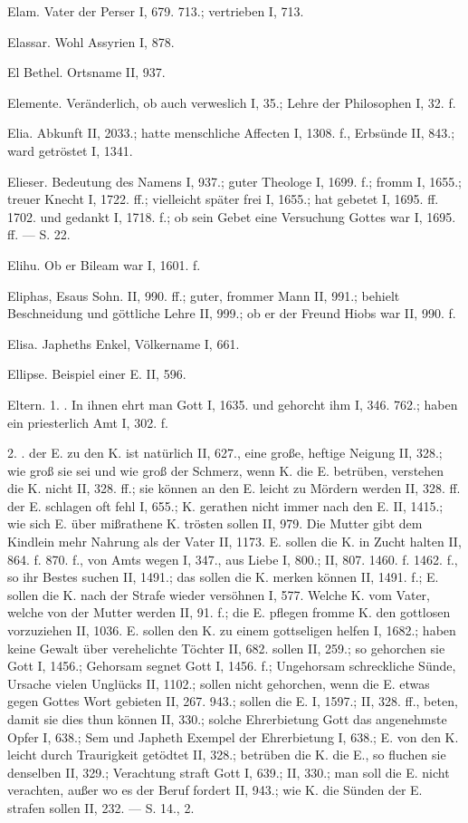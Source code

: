 Elam. Vater der Perser I, 679. 713.; vertrieben I, 713.

Elassar. Wohl Assyrien I, 878.

El Bethel. Ortsname II, 937.

Elemente. Veränderlich, ob auch verweslich I, 35.; Lehre der Philosophen I, 32. f.

Elia. Abkunft II, 2033.; hatte menschliche Affecten I, 1308. f., Erbsünde II, 843.; ward getröstet I, 1341.

Elieser. Bedeutung des Namens I, 937.; guter Theologe I, 1699. f.; fromm I, 1655.; treuer Knecht I, 1722. ff.; vielleicht später frei I, 1655.; hat gebetet I, 1695. ff. 1702. und gedankt I, 1718. f.; ob sein Gebet eine Versuchung Gottes war I, 1695. ff. — S.  22.

Elihu. Ob er Bileam war I, 1601. f.

Eliphas, Esaus Sohn. II, 990. ff.; guter, frommer Mann II, 991.; behielt Beschneidung und göttliche Lehre II, 999.; ob er der Freund Hiobs war II, 990. f.

Elisa. Japheths Enkel, Völkername I, 661.

Ellipse. Beispiel einer E. II, 596.

Eltern. 1. . In ihnen ehrt man Gott I, 1635. und gehorcht ihm I, 346. 762.; haben ein priesterlich Amt I, 302. f.

2. .  der E. zu den K. ist natürlich II, 627., eine große, heftige Neigung II, 328.; wie groß sie sei und wie groß der Schmerz, wenn K. die E. betrüben, verstehen die K. nicht II, 328. ff.; sie können an den E. leicht zu Mördern werden II, 328. ff.  der E. schlagen oft fehl I, 655.; K. gerathen nicht immer nach den E. II, 1415.; wie sich E. über mißrathene K. trösten sollen II, 979. Die Mutter gibt dem Kindlein mehr Nahrung als der Vater II, 1173. E. sollen die K. in Zucht halten II, 864. f. 870. f., von Amts wegen  I, 347., aus Liebe I, 800.; II, 807. 1460. f. 1462. f., so ihr Bestes suchen II, 1491.; das sollen die K. merken können II, 1491. f.; E. sollen die K. nach der Strafe wieder versöhnen I, 577. Welche K. vom Vater, welche von der Mutter  werden II, 91. f.; die E. pflegen fromme K. den gottlosen vorzuziehen II, 1036. E. sollen den K. zu einem gottseligen  helfen I, 1682.; haben keine Gewalt über verehelichte Töchter II, 682.  sollen  II, 259.; so gehorchen sie Gott I, 1456.; Gehorsam segnet Gott I, 1456. f.; Ungehorsam schreckliche Sünde, Ursache vielen Unglücks II, 1102.; sollen nicht gehorchen, wenn die E. etwas gegen Gottes Wort gebieten II, 267. 943.; sollen die E.  I, 1597.; II, 328. ff., beten, damit sie dies thun können II, 330.; solche Ehrerbietung Gott das angenehmste Opfer I, 638.; Sem und Japheth Exempel der Ehrerbietung I, 638.; E. von den K. leicht durch Traurigkeit getödtet II, 328.; betrüben die K. die E., so fluchen sie denselben II, 329.; Verachtung straft Gott I, 639.; II, 330.; man soll die E. nicht verachten, außer wo es der Beruf fordert II, 943.; wie K. die Sünden der E. strafen sollen II, 232. — S.  14.,  2.


